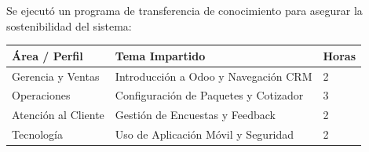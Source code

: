 Se ejecutó un programa de transferencia de conocimiento para asegurar la sostenibilidad del sistema:

\begin{table}[htbp]
\centering
\renewcommand{\arraystretch}{1.25}
\begin{tabular}{|p{3.2cm}|p{7.8cm}|p{1.8cm}|}
\hline
\textbf{Área / Perfil} & \textbf{Tema Impartido} & \textbf{Horas} \\ \hline
Gerencia y Ventas & Introducción a Odoo y Navegación CRM & 2 \\ \hline
Operaciones & Configuración de Paquetes y Cotizador & 3 \\ \hline
Atención al Cliente & Gestión de Encuestas y Feedback & 2 \\ \hline
Tecnología & Uso de Aplicación Móvil y Seguridad & 2 \\ \hline
\end{tabular}
\end{table}
